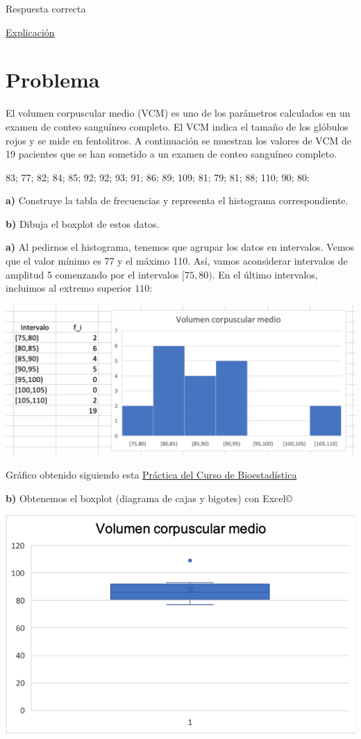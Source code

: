 \documentclass[
]{book}
\begin{document}
Respuesta correcta

\href{https://1fjmanzano.github.io/bioestadistica/diagramas-de-barras-y-sectores.html}{Explicación}

\hypertarget{problema-10}{%
\section{Problema}\label{problema-10}}

El volumen corpuscular medio (VCM) es uno de los parámetros calculados en un examen de conteo sanguíneo completo. El VCM indica el tamaño de los glóbulos rojos y se mide en fentolitros. A continuación se muestran los valores de VCM de 19 pacientes que se han sometido a un examen de conteo sanguíneo completo.

83; 77; 82; 84; 85; 92; 92; 93; 91; 86; 89; 109; 81; 79; 81; 88; 110; 90; 80:

\textbf{a)} Construye la tabla de frecuencias y representa el histograma correspondiente.

\textbf{b)} Dibuja el boxplot de estos datos.

\textbf{a)} Al pedirnos el histograma, tenemos que agrupar los datos en intervalos. Vemos que el valor mínimo es 77 y el máximo 110. Así, vamos aconsiderar intervalos de amplitud 5 comenzando por el intervalos \([75,80)\). En el último intervalos, incluimos al extremo superior \(110\):

\includegraphics[width=18.58in]{img/2_6}

Gráfico obtenido siguiendo esta \href{https://1fjmanzano.github.io/bioestadistica/histogramas.html\#histogramas-con-excel-pr\%C3\%A1cticas}{Práctica del Curso de Bioestadística}

\textbf{b)} Obtenemos el boxplot (diagrama de cajas y bigotes) con Excel©

\includegraphics[width=9.92in]{img/2_7}
\end{document}

